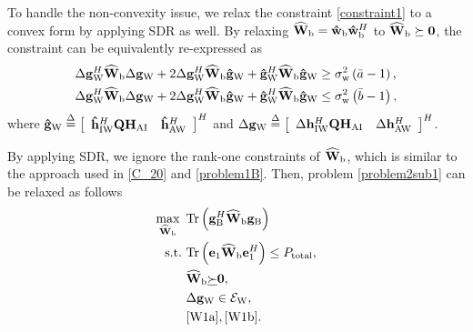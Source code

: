 \documentclass[10pt,journal,letterpaper,twocolumn,twoside]{IEEEtran} %
\begin{document}
To handle the non-convexity issue, we  relax  the constraint \eqref{constraint1} to a convex form by applying SDR as well. By relaxing ${\widehat {\bf{W}}_{\rm{b}}} = {{{\bf{\hat w}}}_{\rm{b}}}{\bf{\hat w}}_{\rm{b}}^H$
to ${\widehat {\bf{W}}_{\rm{b}}} \succeq {\bf{0}}$, the constraint can be  equivalently re-expressed as
\begin{subequations}
\begin{align}
&\Delta {\bf{g}}_{\rm{W}}^H{\widehat {\bf{W}}_{\rm{b}}}\Delta {{\bf{g}}_{\rm{W}}} + 2\Delta {\bf{g}}_{\rm{W}}^H{\widehat {\bf{W}}_{\rm{b}}}{{{\bf{\hat g}}}_{\rm{W}}} + {\bf{\hat g}}_{\rm{W}}^H{\widehat {\bf{W}}_{\rm{b}}}{{{\bf{\hat g}}}_{\rm{W}}} \ge \sigma _{\rm{w}}^2\left( {\bar a - 1} \right)\label{W1a},\\
& \Delta {\bf{g}}_{\rm{W}}^H{\widehat {\bf{W}}_{\rm{b}}}\Delta {{\bf{g}}_{\rm{W}}} + 2\Delta {\bf{g}}_{\rm{W}}^H{\widehat {\bf{W}}_{\rm{b}}}{{{\bf{\hat g}}}_{\rm{W}}} + {\bf{\hat g}}_{\rm{W}}^H{\widehat {\bf{W}}_{\rm{b}}}{{{\bf{\hat g}}}_{\rm{W}}}\le \sigma _{\rm{w}}^2\left( {\bar b - 1} \right)\label{W1b},
 \end{align}
 \end{subequations}
 where  ${{{\bf{\hat g}}}_{\rm{W}}} \buildrel \Delta \over ={\left[ {\begin{array}{*{20}{c}}
{{\bf{\hat h}}_{{\rm{IW}}}^H{\bf{Q}}{{\bf{H}}_{{\rm{AI}}}}}&{{\bf{\hat h}}_{{\rm{AW}}}^H}
\end{array}} \right]^H}$  and
$\Delta {{\bf{g}}_{\rm{W}}} \buildrel \Delta \over = {\left[ {\begin{array}{*{20}{c}}
{\Delta {\bf{h}}_{{\rm{IW}}}^H{\bf{Q}}{{\bf{H}}_{{\rm{AI}}}}}&{\Delta {\bf{h}}_{{\rm{AW}}}^H}
\end{array}} \right]^H}$.

By applying SDR, we  ignore the  rank-one constraints of   ${\widehat {\bf{W}}_{\rm{b}}}$,
   which is similar to the approach used in \eqref{C_20} and  \eqref{problem1B}. Then, problem \eqref{problem2sub1}  can be relaxed as follows
\begin{subequations}\label{2sub1sdr}
\begin{align}
\mathop {\max }\limits_{{\widehat {\bf{W}}_{\rm{b}}}} {\rm{ }}~&{\rm{Tr}}\left( {{\bf{g}}_{\rm{B}}^H{{\widehat {\bf{W}}}_{\rm{b}}}{\bf{g}}_{\rm{B}}} \right)\\
  {\text{s}}{\text{.t}}{\text{.}}~&{\rm{Tr}}\left( {{{\bf{e}}_1}{{\widehat {\bf{W}}}_{\rm{b}}}{\bf{e}}_1^H} \right)\le  {P_{{\rm{total}}}},\label{2sub1sdra}\\
 &{\widehat {\bf{W}}_{\rm{b}}} \underline  \succ  {\bf{0}},\label{2sub1sdrc}\\
  &\Delta {{\bf{g}}_{\rm{W}}} \in {{\cal E}_{\rm{W}}},\label{2sub1sdrb}\\
&\eqref{W1a}, \eqref{W1b}\notag.
 \end{align}
\end{subequations}
\end{document}
